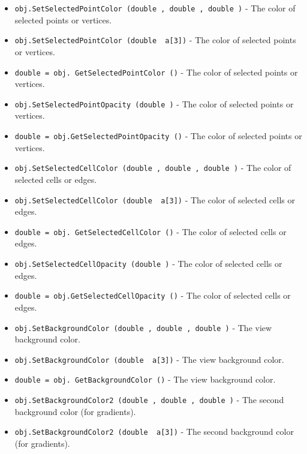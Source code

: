 \begin{itemize}
\item  \verb|obj.SetSelectedPointColor (double , double , double )| -  The color of selected points or vertices.

\item  \verb|obj.SetSelectedPointColor (double  a[3])| -  The color of selected points or vertices.

\item  \verb|double = obj. GetSelectedPointColor ()| -  The color of selected points or vertices.

\item  \verb|obj.SetSelectedPointOpacity (double )| -  The color of selected points or vertices.

\item  \verb|double = obj.GetSelectedPointOpacity ()| -  The color of selected points or vertices.

\item  \verb|obj.SetSelectedCellColor (double , double , double )| -  The color of selected cells or edges.

\item  \verb|obj.SetSelectedCellColor (double  a[3])| -  The color of selected cells or edges.

\item  \verb|double = obj. GetSelectedCellColor ()| -  The color of selected cells or edges.

\item  \verb|obj.SetSelectedCellOpacity (double )| -  The color of selected cells or edges.

\item  \verb|double = obj.GetSelectedCellOpacity ()| -  The color of selected cells or edges.

\item  \verb|obj.SetBackgroundColor (double , double , double )| -  The view background color.

\item  \verb|obj.SetBackgroundColor (double  a[3])| -  The view background color.

\item  \verb|double = obj. GetBackgroundColor ()| -  The view background color.

\item  \verb|obj.SetBackgroundColor2 (double , double , double )| -  The second background color (for gradients).

\item  \verb|obj.SetBackgroundColor2 (double  a[3])| -  The second background color (for gradients).


\end{itemize}
